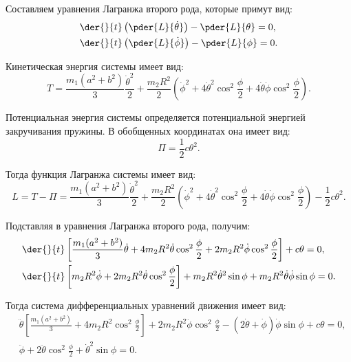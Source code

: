     Составляем уравнения Лагранжа второго рода, которые примут вид:
    \begin{align*}
        & \der{}{t}\left(\pder{L}{\dot{\theta}}\right) - \pder{L}{\theta} = 0, \\
        & \der{}{t}\left(\pder{L}{\dot{\phi}}\right) - \pder{L}{\phi} = 0.
    \end{align*}
    
    Кинетическая энергия системы имеет вид:
    \[
        T = \frac{m_1(a^2 + b^2)}{3}\frac{\dot{\theta}^2}{2} +
        \frac{m_2R^2}{2}\left(\dot{\phi}^2 + 4\dot{\theta}^2\cos^2\frac{\phi}{2}
        + 4\dot{\theta}\dot{\phi}\cos^2\frac{\phi}{2}\right).
    \]
    
    Потенциальная энергия системы определяется потенциальной энергией
    закручивания пружины. В обобщенных координатах она имеет вид:
    \[
        \varPi = \frac{1}{2}c\theta^2.
    \]
    
    Тогда функция Лагранжа системы имеет вид:
    \[
        L = T - \varPi = \frac{m_1(a^2 + b^2)}{3}\frac{\dot{\theta}^2}{2} +
        \frac{m_2R^2}{2}\left(\dot{\phi}^2 + 4\dot{\theta}^2\cos^2\frac{\phi}{2}
        + 4\dot{\theta}\dot{\phi}\cos^2\frac{\phi}{2}\right) - \frac{1}{2}c\theta^2.
    \]
    
    Подставляя в уравнения Лагранжа второго рода, получим:
    \begin{align*}
        & \der{}{t}\left[\frac{m_1(a^2 + b^2)}{3}\dot{\theta} +
        4m_2R^2\dot{\theta}\cos^2\frac{\phi}{2} +
        2m_2R^2\dot{\phi}\cos^2\frac{\phi}{2}\right] + c\theta = 0, \\
        & \der{}{t}\left[m_2R^2\dot{\phi} + 2m_2R^2\dot{\theta}
        \cos^2\frac{\phi}{2}\right] + m_2R^2\dot{\theta}^2\sin\phi +
        m_2R^2\dot{\theta}\dot{\phi}\sin\phi = 0.
    \end{align*}
    
    Тогда система дифференциальных уравнений движения имеет вид:
    \begin{align*}
        & \ddot{\theta}\left[\frac{m_1(a^2 + b^2)}{3} + 4m_2R^2
        \cos^2\frac{\phi}{2}\right] + 2m_2R^2\ddot{\phi}\cos^2\frac{\phi}{2} -
        (2\dot{\theta} + \dot{\phi})\dot{\phi}\sin\phi + c\theta = 0, \\
        & \ddot{\phi} + 2\ddot{\theta}\cos^2\frac{\phi}{2} + \dot{\theta}^2
        \sin\phi = 0.
    \end{align*}

    
